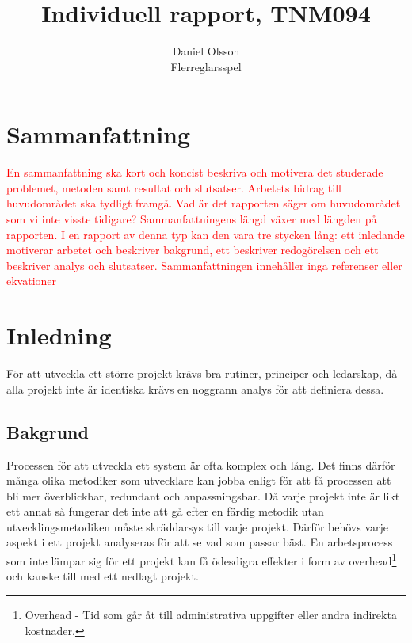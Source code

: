 \documentclass[a4paper,12pt,oneside,final]{extbook}
\title{Individuell rapport, TNM094}
\author{Daniel Olsson\\Flerreglarsspel}
\begin{document}
\pagestyle{empty}
\thispagestyle{empty}

\frontmatter

\maketitle

\pagestyle{fancy}

\chapter{Sammanfattning}

\textcolor{red}{
En sammanfattning ska kort och koncist beskriva och motivera det studerade problemet, metoden
samt resultat och slutsatser. Arbetets bidrag till huvudområdet ska tydligt framgå. Vad är det rapporten
säger om huvudområdet som vi inte visste tidigare?
Sammanfattningens längd växer med längden på rapporten. I en rapport av denna typ kan den vara tre
stycken lång: ett inledande motiverar arbetet och beskriver bakgrund, ett beskriver redogörelsen och
ett beskriver analys och slutsatser. Sammanfattningen innehåller inga referenser eller ekvationer}


\tableofcontents

\cleardoublepage
{}
\listoffigures

\cleardoublepage
{}
\listoftables

\mainmatter

\chapter{Inledning}
\label{ch:inledning}

För att utveckla ett större projekt krävs bra rutiner, principer och ledarskap, då alla projekt inte är identiska krävs en noggrann analys för att definiera dessa.

\section{Bakgrund}
 Processen för att utveckla ett system är ofta komplex och lång. Det finns därför många olika metodiker som utvecklare kan jobba enligt för att få processen att bli mer överblickbar, redundant och anpassningsbar. Då varje projekt inte är likt ett annat så fungerar det inte att gå efter en färdig metodik utan utvecklingsmetodiken måste skräddarsys till varje projekt. Därför behövs varje aspekt i ett projekt analyseras för att se vad som passar bäst. En arbetsprocess som inte lämpar sig för ett projekt kan få ödesdigra effekter i form av overhead\footnote{Overhead - Tid som går åt till administrativa uppgifter eller andra indirekta kostnader.} och kanske till med ett nedlagt projekt.
\end{document}
